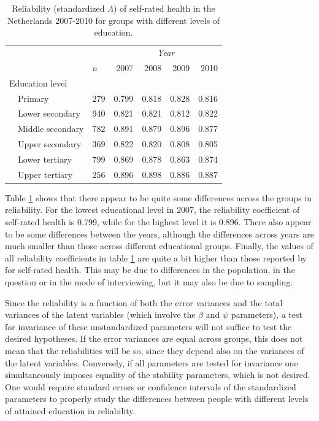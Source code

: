 \documentclass[a4paper, 11pt]{article}
\newcommand{\0}{\boldsymbol{0}}
\begin{document}
\begin{table}[bth]
\begin{center}\begin{small}
\begin{tabular}{lllrrrr}  \hline  \hline
&&&  \multicolumn{4}{c}{\emph{Year}}\\\cline{4-7}
&&$n$& 2007&2008&2009&2010\\
  \hline
  \multicolumn{2}{l}{Education level}\\
& Primary	   & $279$  & 0.799 & 0.818 & 0.828 & 0.816 \\ 
& Lower secondary  & $940$  & 0.821 & 0.821 & 0.812 & 0.822 \\ 
& Middle secondary & $782$  & 0.891 & 0.879 & 0.896 & 0.877 \\ 
& Upper secondary  & $369$  & 0.822 & 0.820 & 0.808 & 0.805 \\ 
& Lower tertiary   & $799$  & 0.869 & 0.878 & 0.863 & 0.874 \\ 
& Upper tertiary   & $256$  & 0.896 & 0.898 & 0.886 & 0.887 \\ 
  \hline     \hline
\end{tabular}
\caption{Reliability (standardized $\Lambda$) of self-rated health in the Netherlands 2007-2010 for groups with different levels of education.}\label{tab:first-results}\end{small}
\end{center}
\end{table}

Table \ref{tab:first-results} shows that there appear to be quite some differences across the groups in reliability. 
For the lowest educational level in 2007, the reliability coefficient of self-rated health is 0.799, while for the highest level it is 0.896.
There also appear to be some differences between the years, although the differences across years are much smaller than those across
different educational groups. Finally, the values of all reliability coefficients in table \ref{tab:first-results} are quite a bit higher than those reported by \cite{lundberg1996assessing} 
for self-rated health. This may be due to differences in the population, in the question or in the mode of interviewing, but it may also be due to sampling. 

Since the reliability is a function of both the error variances and the total variances of the latent variables (which involve the 
$\beta$ and $\psi$ parameters), a test for invariance of these unstandardized parameters will not suffice to test the desired hypotheses. 
If the error variances are equal across groups, this does not mean that the reliabilities will be so, since they depend also on the
variances of the latent variables. Conversely, if all parameters are tested for invariance one simultaneously imposes equality of the
stability parameters, which is not desired.
One would require standard errors or confidence intervals of the standardized parameters to properly study the differences between people with different levels of attained education in reliability.
\end{document}
